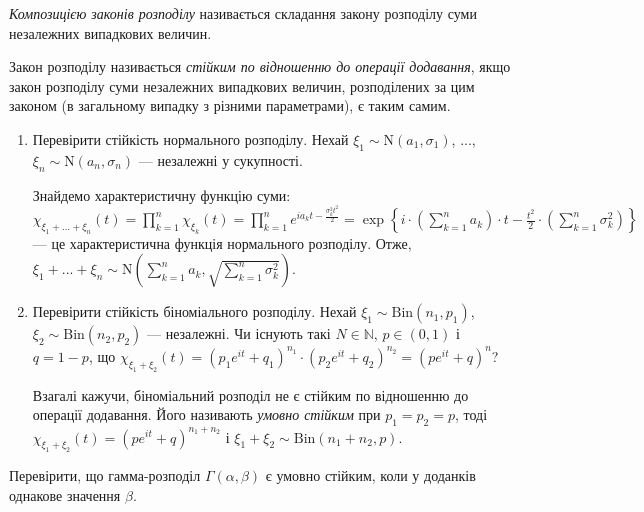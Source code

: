 \begin{definition}
    \emph{Композицією законів розподілу} називається складання закону розподілу суми незалежних випадкових величин.
    
    Закон розподілу називається \emph{стійким по відношенню до операції додавання},
    якщо закон розподілу суми незалежних випадкових величин, розподілених за цим законом (в загальному випадку з різними параметрами),
    є таким самим.
\end{definition}
\begin{example}
    \begin{enumerate}
        \item Перевірити стійкість нормального розподілу. Нехай $\xi_1 \sim \mathrm{N}(a_1, \sigma_1)$, $...$, $\xi_n \sim \mathrm{N}(a_n, \sigma_n)$ ---
        незалежні у сукупності. 
    
        Знайдемо характеристичну функцію суми: $\chi_{\xi_1 + ... + \xi_n}(t) = \prod\limits_{k=1}^n \chi_{\xi_k}(t)=
        \prod\limits_{k=1}^n e^{ia_k t - \frac{\sigma_k^2 t^2}{2}} = 
        \exp\left\{i\cdot \left( \sum\limits_{k=1}^n a_k\right)\cdot t - \frac{t^2}{2}\cdot\left( \sum\limits_{k=1}^n \sigma_k^2\right)\right\}$ ---
        це характеристична функція нормального розподілу. Отже, $\xi_1 + ... + \xi_n \sim \mathrm{N}\left(\sum\limits_{k=1}^n a_k,  \sqrt{\sum\limits_{k=1}^n \sigma_k^2}\right)$.
        \item Перевірити стійкість біноміального розподілу. Нехай $\xi_1 \sim \mathrm{Bin}(n_1, p_1)$, $\xi_2 \sim \mathrm{Bin}(n_2, p_2)$ --- незалежні.
        Чи існують такі $N \in \mathbb{N}$, $p \in (0, 1)$ і $q = 1 - p$, що
        $\chi_{\xi_1 + \xi_2} (t) = \left( p_1 e^{it} + q_1\right)^{n_1} \cdot \left( p_2 e^{it} + q_2\right)^{n_2} = \left(p e^{it} + q\right)^n$?

        Взагалі кажучи, біноміальний розподіл не є стійким по відношенню до операції додавання.
        Його називають \emph{умовно стійким} при $p_1 = p_2 = p$, тоді
        $\chi_{\xi_1 + \xi_2} (t) = \left( p e^{it} + q\right)^{n_1 + n_2}$ і $\xi_1 + \xi_2 \sim \mathrm{Bin}(n_1+n_2, p)$.
    \end{enumerate}
\end{example}

\begin{exercise}
    Перевірити, що гамма-розподіл $\Gamma(\alpha, \beta)$ є умовно стійким, коли у доданків однакове значення $\beta$.
\end{exercise}

